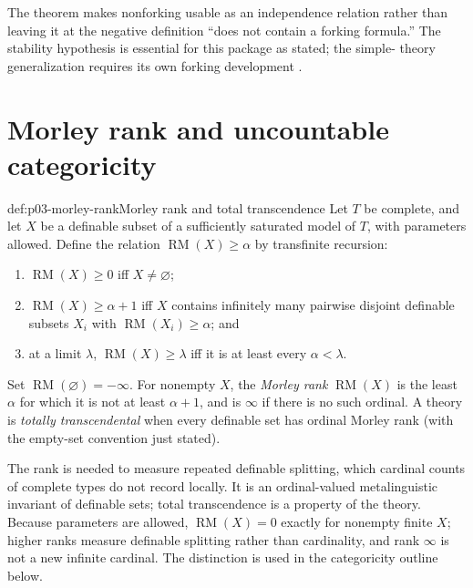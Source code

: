 The theorem makes nonforking usable as an independence relation rather than
leaving it at the negative definition ``does not contain a forking formula.''
The stability hypothesis is essential for this package as stated; the simple-
theory generalization requires its own forking development
\cite{Shelah1971Stability,TentZiegler2012}.

\section{Morley rank and uncountable categoricity}
\label{sec:p03-morley-rank}

\begin{hbdefinition}{def:p03-morley-rank}{Morley rank and total transcendence}
Let \(T\) be complete, and let \(X\) be a definable subset of a sufficiently
saturated model of \(T\), with parameters allowed.  Define the relation
\(\operatorname{RM}(X)\geq\alpha\) by transfinite recursion:
\begin{enumerate}
  \item \(\operatorname{RM}(X)\geq0\) iff \(X\ne\varnothing\);
  \item \(\operatorname{RM}(X)\geq\alpha+1\) iff \(X\) contains infinitely
        many pairwise disjoint definable subsets \(X_i\) with
        \(\operatorname{RM}(X_i)\geq\alpha\); and
  \item at a limit \(\lambda\), \(\operatorname{RM}(X)\geq\lambda\) iff it
        is at least every \(\alpha<\lambda\).
\end{enumerate}
Set \(\operatorname{RM}(\varnothing)=-\infty\).  For nonempty \(X\), the
\emph{Morley rank} \(\operatorname{RM}(X)\) is the least \(\alpha\) for which
it is not at least \(\alpha+1\), and is \(\infty\) if there is no such ordinal.
A theory is \emph{totally transcendental} when every definable set has ordinal
Morley rank (with the empty-set convention just stated).

The rank is needed to measure repeated definable splitting, which cardinal
counts of complete types do not record locally.  It is an ordinal-valued
metalinguistic invariant of definable sets; total transcendence is a property
of the theory.  Because parameters are allowed,
\(\operatorname{RM}(X)=0\) exactly for nonempty finite \(X\); higher ranks
measure definable splitting rather than cardinality, and rank \(\infty\) is
not a new infinite cardinal.  The distinction is used in the categoricity
outline below.
\end{hbdefinition}

